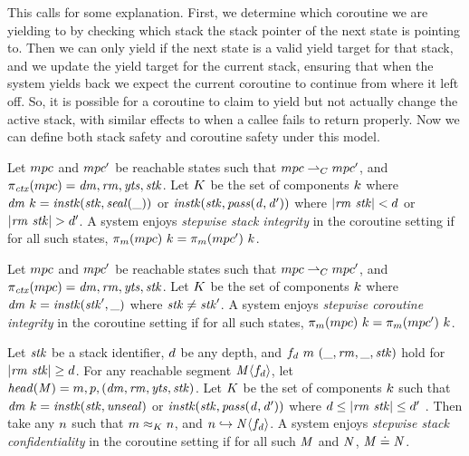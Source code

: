 \documentclass[acmsmall,review,anonymous]{acmart}\settopmatter{printfolios=true,printccs=false,printacmref=false}
\begin{document}
This calls for some explanation. First, we determine which coroutine we are yielding to by
checking which stack the stack pointer of the next state is pointing to. Then we can only yield
if the next state is a valid yield target for that stack, and we update the yield target for
the current stack, ensuring that when the system yields back we expect the current coroutine
to continue from where it left off. So, it is possible for a coroutine to claim to yield
but not actually change the active stack, with similar effects to when a callee fails
to return properly. Now we can define both stack safety and coroutine safety under this model.

 Let \(mpc\) and \(mpc'\) be reachable states such that
\(mpc \overset{}{\rightharpoonup}_C mpc'\), and \(\pi_{\mathit{ctx}}(mpc) = \mathit{dm},\mathit{rm},\mathit{yts},\mathit{stk}\).
Let \(K\) be the set of components \(k\) where
\(\mathit{dm} ~ k = \mathit{instk}(\mathit{stk},\mathit{seal(\_)})\) or
\(\mathit{instk}(\mathit{stk},\mathit{pass(d,d')})\)
where \(|\mathit{rm} ~ \mathit{stk}| < d\) or \(|\mathit{rm} ~ \mathit{stk}| > d'\). A system enjoys
{\em stepwise stack integrity} in the coroutine setting if for all
such states, \(\pi_m(mpc) ~ k = \pi_m(mpc') ~ k\).

 Let \(mpc\) and \(mpc'\) be reachable states such that
\(mpc \overset{}{\rightharpoonup}_C mpc'\), and \(\pi_{\mathit{ctx}}(mpc) = \mathit{dm},\mathit{rm},\mathit{yts},\mathit{stk}\).
Let \(K\) be the set of components \(k\) where
\(\mathit{dm} ~ k = \mathit{instk}(\mathit{stk}',\_)\) where \(\mathit{stk} \not = \mathit{stk}'\).
A system enjoys {\em stepwise coroutine integrity} in the coroutine setting if for all
such states, \(\pi_m(mpc) ~ k = \pi_m(mpc') ~ k\).

 Let \(\mathit{stk}\) be a stack identifier, \(d\) be any depth, and
\(f_d ~ m ~ (\_, \mathit{rm}, \_, \mathit{stk})\) hold for \(|\mathit{rm} ~ \mathit{stk}| \geq d\).
For any reachable segment \(\mathit{M} \langle f_d \rangle\),
let \(\mathit{head}(\mathit{M}) = m,p,(\mathit{dm},\mathit{rm},\mathit{yts},\mathit{stk})\). Let
\(K\) be the set of components \(k\) such that
\(\mathit{dm} ~ k = \mathit{instk}(\mathit{stk},\mathit{unseal})\) or
\(\mathit{instk}(\mathit{stk},\mathit{pass(d,d')})\)
where \(d \leq |\mathit{rm} ~ \mathit{stk}| \leq d'\) .
Then take any \(n\) such that \(m \approx_K n\), and
\(n \hookrightarrow \mathit{N}\langle f_d \rangle\). A system enjoys
{\em stepwise stack confidentiality} in the coroutine setting if for all
such \(\mathit{M}\) and \(\mathit{N}\), \(\mathit{M} \doteq \mathit{N}\).
\end{document}
